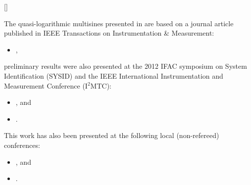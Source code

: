 \begin{refsection}

\makeatletter
\DeclareCiteCommand{\fullcite}
  {%
    }
  {\usedriver
     {}
     {}}
  {\multicitedelim}
  {}
\DeclareCiteCommand{\footfullcite}[\mkbibfootnote]
  {%
    }
  {\usedriver
     {}
     {}}
  {\multicitedelim}
  {}
\makeatother



The quasi-logarithmic multisines presented in  are based on a journal article published in \gls{IEEE} Transactions on Instrumentation \& Measurement:
\begin{itemize}
  \item {}, 
\end{itemize}
preliminary results were also presented at the 2012 \gls{IFAC} symposium on System Identification (\textsc{SYSID}) and the \gls{IEEE} International Instrumentation and Measurement Conference (\textsc{I$^{\text{2}}$MTC}):
\begin{itemize}
  \item {}, and
  \item {}.
\end{itemize}
This work has also been presented at the following local (non-refereed) conferences:
\begin{itemize}
  \item {}, and
  \item {}.
\end{itemize}


\end{refsection}
